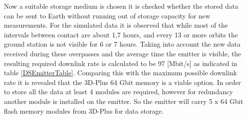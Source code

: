 Now a suitable storage medium is chosen it is checked whether the stored data can be sent to Earth without running out of storage capacity for new measurements. For the simulated data it is observed that while most of the intervals between contact are about 1,7 hours, and every 13 or more orbits the ground station is not visible for 6 or 7 hours. Taking into account the new data received during these overpasses and the average time the emitter is visible, the resulting required downlink rate is calculated to be 97 [Mbit/s] as indicated in table \ref{DSEmitterTable}. Comparing this with the maximum possible downlink rate it is revealed that the 3D-Plus 64 Gbit memory is a viable option. In order to store all the data at least 4 modules are required, however for redundancy another module is installed on the emitter. So the emitter will carry 5 x 64 Gbit flash memory modules from 3D-Plus for data storage.